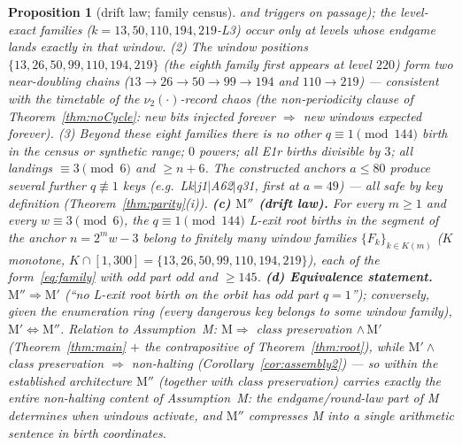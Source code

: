 \documentclass[11pt]{amsart}
\newtheorem{proposition}[theorem]{Proposition}
\theoremstyle{definition}
\newcommand{\vtwo}[1]{\nu_2(#1)}
\begin{document}
\begin{proposition}[drift law; family census]
and triggers on passage); the level-exact families ($k=13,50,110,194,219$-L3)
occur only at levels whose endgame lands exactly in that window. (2) The
window positions $\{13,26,50,99,110,194,219\}$ (the eighth family first
appears at level $220$) form two near-doubling chains ($13\to26\to50\to99\to
194$ and $110\to219$) --- consistent with the timetable of the
$\vtwo{\cdot}$-record chaos (the non-periodicity clause of
Theorem~\ref{thm:noCycle}: new bits injected forever $\Rightarrow$ new
windows expected forever). (3) Beyond these eight families there is
\emph{no other} $q\equiv1\pmod{144}$ birth in the census or synthetic range;
$0$ powers; all E1r births divisible by $3$; all landings $\equiv3\pmod6$ and
$\ge n+6$. The constructed anchors $a\le80$ produce several further
$q\not\equiv1$ keys (e.g.\ Lk$|$j1$|$A62$|$q31, first at $a{=}49$) --- all
safe by key definition (Theorem~\ref{thm:parity}(i)).
\textbf{(c) $\mathrm{M''}$ (drift law).} For every $m\ge1$ and every
$w\equiv3\pmod6$, the $q\equiv1\pmod{144}$ L-exit root births in the segment
of the anchor $n=2^{m}w-3$ belong to finitely many window families
$\{F_k\}_{k\in K(m)}$ ($K$ monotone, $K\cap[1,300]=\{13,26,50,99,110,194,
219\}$), each of the form~\eqref{eq:family} with odd part odd and $\ge145$.
\textbf{(d) Equivalence statement.} $\mathrm{M''}\Rightarrow\mathrm{M'}$
(``no L-exit root birth on the orbit has odd part $q=1$''); conversely, given
the enumeration ring (every dangerous key belongs to some window family),
$\mathrm{M'}\Leftrightarrow\mathrm{M''}$. Relation to Assumption~M:
$\mathrm{M}\Rightarrow$ class preservation $\wedge\,\mathrm{M'}$
(Theorem~\ref{thm:main} $+$ the contrapositive of Theorem~\ref{thm:root}),
while $\mathrm{M'}\wedge$ class preservation $\Rightarrow$ non-halting
(Corollary~\ref{cor:assembly2}) --- so within the established architecture
$\mathrm{M''}$ (together with class preservation) \emph{carries exactly the
entire non-halting content of Assumption~M}: the endgame/round-law part of M
determines when windows activate, and $\mathrm{M''}$ compresses M into a
single arithmetic sentence in birth coordinates.
\end{proposition}
\end{document}
